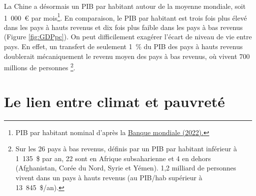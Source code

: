 \documentclass[a5paper,french,openany]{memoir}
\begin{document}
La Chine a désormais un PIB par habitant autour de la moyenne mondiale, soit 1~000~\euro{} par mois\footnote{PIB par habitant nominal d'après la \href{https://data.worldbank.org/indicator/NY.GDP.PCAP.CD?end=2022&locations=CN-1W&start=2015}{Banque mondiale (2022).}}. %
En comparaison, le PIB par habitant est trois fois plus élevé dans les pays à hauts revenus et dix fois plus faible dans les pays à bas revenus (Figure \ref{fig:GDPpc}). On peut difficilement exagérer l'écart de niveau de vie entre pays. En effet, un transfert de seulement 1~\% du PIB des pays à hauts revenus %
doublerait mécaniquement le revenu moyen 
des pays à bas revenus, où vivent 700 millions de personnes%
\footnote{
Sur les 26 pays à bas revenus, définis par un PIB par habitant %
inférieur à 1~135~\$ par an, 22 sont en Afrique subsaharienne et 4 en dehors (Afghanistan, Corée du Nord, Syrie et Yémen). 1,2 milliard de personnes vivent dans un pays à hauts revenus (au PIB/hab supérieur à 13~845~\$/an).
}. %

\section{Le lien entre climat et pauvreté} 
\end{document}
